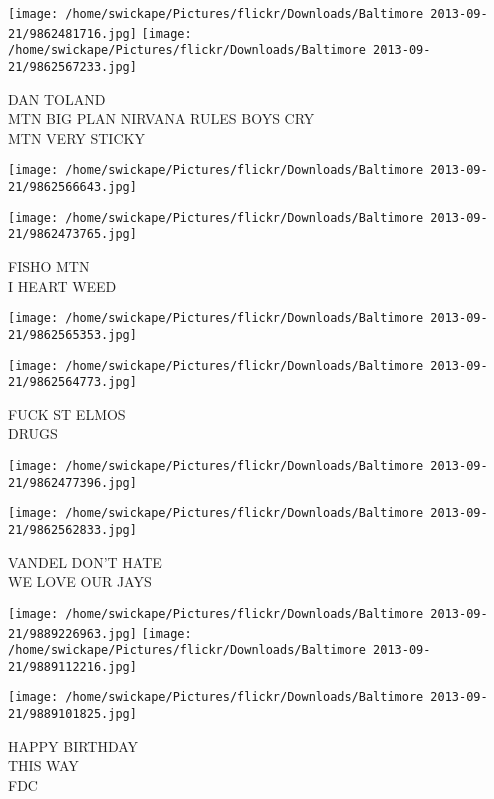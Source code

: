 \documentclass[10pt,letterpaper]{article}
\begin{document}
\vspace{0.25in}
\texttt{[image: /home/swickape/Pictures/flickr/Downloads/Baltimore 2013-09-21/9862481716.jpg]}
\texttt{[image: /home/swickape/Pictures/flickr/Downloads/Baltimore 2013-09-21/9862567233.jpg]}

DAN TOLAND\\
MTN BIG PLAN NIRVANA RULES BOYS CRY\\
MTN VERY STICKY
\pagebreak

\texttt{[image: /home/swickape/Pictures/flickr/Downloads/Baltimore 2013-09-21/9862566643.jpg]}

\vspace{0.25in}
\texttt{[image: /home/swickape/Pictures/flickr/Downloads/Baltimore 2013-09-21/9862473765.jpg]}

FISHO MTN\\
I HEART WEED
\pagebreak

\texttt{[image: /home/swickape/Pictures/flickr/Downloads/Baltimore 2013-09-21/9862565353.jpg]}

\vspace{0.25in}
\texttt{[image: /home/swickape/Pictures/flickr/Downloads/Baltimore 2013-09-21/9862564773.jpg]}

FUCK ST ELMOS\\
DRUGS
\pagebreak

\texttt{[image: /home/swickape/Pictures/flickr/Downloads/Baltimore 2013-09-21/9862477396.jpg]}

\vspace{0.25in}
\texttt{[image: /home/swickape/Pictures/flickr/Downloads/Baltimore 2013-09-21/9862562833.jpg]}

VANDEL DON'T HATE\\
WE LOVE OUR JAYS
\pagebreak

\texttt{[image: /home/swickape/Pictures/flickr/Downloads/Baltimore 2013-09-21/9889226963.jpg]}
\texttt{[image: /home/swickape/Pictures/flickr/Downloads/Baltimore 2013-09-21/9889112216.jpg]}

\vspace{0.25in}
\texttt{[image: /home/swickape/Pictures/flickr/Downloads/Baltimore 2013-09-21/9889101825.jpg]}

HAPPY BIRTHDAY\\
THIS WAY\\
FDC
\pagebreak
\end{document}
